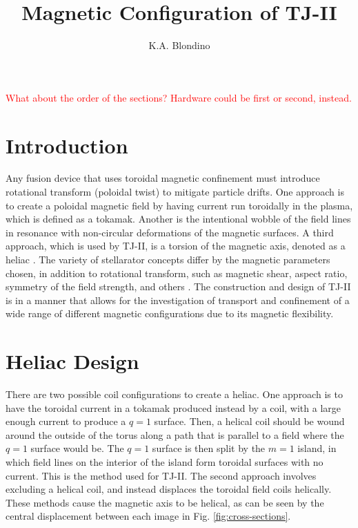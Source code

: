 \documentclass[a4paper]{article}
\author{K.A. Blondino}
\title{Magnetic Configuration of TJ-II}
\newcommand\mynotes[1]{\textcolor{red}{#1}}
\begin{document}
\maketitle

\mynotes{What about the order of the sections? Hardware could be first or second, instead.}

\section*{Introduction}
Any fusion device that uses toroidal magnetic confinement must introduce rotational transform (poloidal twist) to mitigate particle drifts.
One approach is to create a poloidal magnetic field by having current run toroidally in the plasma, which is defined as a tokamak.
Another is the intentional wobble of the field lines in resonance with non-circular deformations of the magnetic surfaces.
A third approach, which is used by TJ-II, is a torsion of the magnetic axis, denoted as a heliac \cite{boozer_what_1998}.
The variety of stellarator concepts differ by the magnetic parameters chosen, in addition to rotational transform, such as magnetic shear, aspect ratio, symmetry of the field strength, and others \cite{iaea_fusion_2012}.
The construction and design of TJ-II is in a manner that allows for the investigation of transport and confinement of a wide range of different magnetic configurations due to its magnetic flexibility.


\section*{Heliac Design}
There are two possible coil configurations to create a heliac.
One approach is to have the toroidal current in a tokamak produced instead by a coil, with a large enough current to produce a $q = 1$ surface.
Then, a helical coil should be wound around the outside of the torus along a path that is parallel to a field where the $q = 1$ surface would be.
The $q = 1$ surface is then split by the $m = 1$ island, in which field lines on the interior of the island form toroidal surfaces with no current.
This is the method used for TJ-II.
The second approach involves excluding a helical coil, and instead displaces the toroidal field coils helically\cite{boozer_what_1998}.
These methods cause the magnetic axis to be helical, as can be seen by the central displacement between each image in Fig. \ref{fig:cross-sections}.
\end{document}
